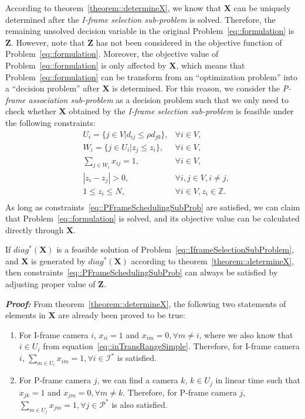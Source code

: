 According to theorem~\ref{theorem::determineX}, we know that $\mathbf{X}$ can be uniquely determined after the \emph{I-frame selection sub-problem} is solved.
Therefore, the remaining unsolved decision variable in the original Problem~\eqref{eq::formulation} is $\mathbf{Z}$.
However, note that $\mathbf{Z}$ has not been considered in the objective function of Problem~\eqref{eq::formulation}.
Moreover, the objective value of Problem~\eqref{eq::formulation} is only affected by $\mathbf{X}$, which means that Problem~\eqref{eq::formulation} can be transform from an ``optimization problem'' into a ``decision problem'' after $\mathbf{X}$ is determined.
For this reason, we consider the \emph{P-frame association sub-problem} as a decision problem such that we only need to check whether $\mathbf{X}$ obtained by the \emph{I-frame selection sub-problem} is feasible under the following constraints:
\begin{align}
	&U_i = \{ j \in V | d_{ij} \leq \rho d_{j0} \}, &\forall i \in V, \nonumber \\
	&W_i = \{ j \in U_i | z_j \leq z_i \}, &\forall i \in V, \nonumber \\
	&\sum_{j \in W_i} x_{ij} = 1, &\forall i \in V, \nonumber \\
	&|z_i - z_j| > 0, &\forall i,j \in V, i \neq j, \nonumber \\
	&1 \leq z_i \leq N, &\forall i \in V, z_i \in \mathbb{Z}. \nonumber \\
\label{eq::PFrameSchedulingSubProb}
\end{align}
As long as constraints~\eqref{eq::PFrameSchedulingSubProb} are satisfied, we can claim that Problem~\eqref{eq::formulation} is solved, and its objective value can be calculated directly through $\mathbf{X}$.
%
\begin{mythm}
If $diag^*(\mathbf{X})$ is a feasible solution of Problem~\eqref{eq::IframeSelectionSubProblem}, and $\mathbf{X}$ is generated by $diag^*(\mathbf{X})$ according to theorem~\ref{theorem::determineX}, then constraints~\eqref{eq::PFrameSchedulingSubProb} can always be satisfied by adjusting proper value of $\mathbf{Z}$.
\label{theorem::IFrameSolalwaysFeasible}
\end{mythm}
\textbf{\emph{Proof:}}
From theorem~\ref{theorem::determineX}, the following two statements of elements in $\mathbf{X}$ are already been proved to be true:
\begin{enumerate}
\item For I-frame camera $i$, $x_{ii}=1$ and ${x_{im} = 0}, {\forall m \neq i}$, where we also know that $i \in U_i$ from equation~\eqref{eq::inTransRangeSimple}.
Therefore, for I-frame camera $i$, ${\underset{m \in U_i}{\sum} x_{im}=1},{\forall i \in \mathcal{I}^*}$ is satisfied.
\item For P-frame camera $j$, we can find a camera $k$, ${k \in U_j}$ in linear time such that ${x_{jk} = 1}$ and ${x_{jm}=0}, \forall m \neq k$.
Therefore, for P-frame camera $j$, ${\underset{m \in U_j}{\sum} x_{jm}=1},{\forall j \in \mathcal{P}^*}$ is also satisfied.
\end{enumerate}
